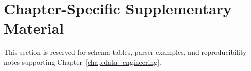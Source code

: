 
\section*{Chapter-Specific Supplementary Material}
\label{sec:supp_data_engineering}

This section is reserved for schema tables, parser examples, and reproducibility
notes supporting Chapter~\ref{chap:data_engineering}.
